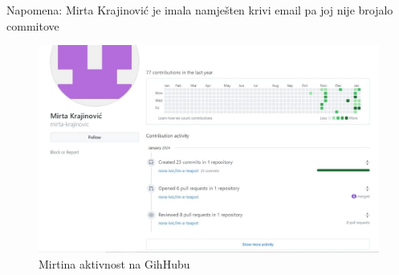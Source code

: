 		Napomena: Mirta Krajinović je imala namješten krivi email pa joj nije brojalo commitove

				\begin{figure}[H]
					\includegraphics[scale=0.37]{slike/commitM.jpg} %
					\centering
					\caption{Mirtina aktivnost na GihHubu}
					\label{fig:commitoviM}
				\end{figure}
		
	